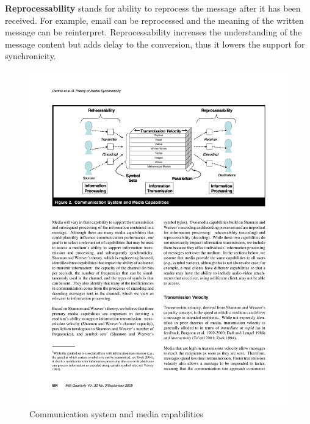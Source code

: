 \documentclass[english,12pt,a4paper,pdftex]{article}
\begin{document}
\textbf{Reprocessability} stands for ability to reprocess the message after it has been received. For example, email can be reprocessed and the meaning of the written message can be reinterpret. Reprocessability increases the understanding of the message content but adds delay to the conversion, thus it lowers the support for synchronicity.

\begin{figure}[htb]
\begin{center}
\includegraphics[width=1.0\textwidth]{mst_properties.pdf}
\end{center}
\caption{Communication system and media capabilities \citep{dennis2008}}
\label{fig:mst_properties}
\end{figure}
\end{document}
